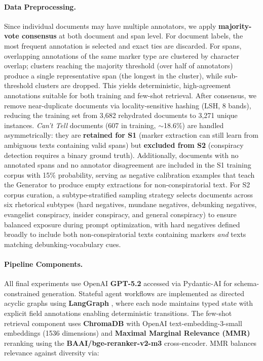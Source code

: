 \documentclass[11pt]{article}
\begin{document}
\paragraph{Data Preprocessing.}
Since individual documents may have multiple annotators, we apply
\textbf{majority-vote consensus} at both document and span level. For document
labels, the most frequent annotation is selected and exact ties are discarded.
For spans, overlapping annotations of the same marker type are clustered by
character overlap; clusters reaching the majority threshold (over half of
annotators) produce a single representative span (the longest in the cluster),
while sub-threshold clusters are dropped. This yields deterministic,
high-agreement annotations suitable for both training and few-shot retrieval.
After consensus, we remove near-duplicate documents via locality-sensitive
hashing (LSH, 8 bands), reducing the training set from 3,682 rehydrated
documents to 3,271 unique instances. \textit{Can't Tell} documents (607 in
training, $\sim$18.6\%) are handled asymmetrically: they are \textbf{retained
	for S1} (marker extraction can still learn from ambiguous texts containing
valid spans) but \textbf{excluded from S2} (conspiracy detection requires a
binary ground truth). Additionally, documents with no annotated spans and no
annotator disagreement are included in the S1 training corpus with 15\%
probability, serving as negative calibration examples that teach the Generator
to produce empty extractions for non-conspiratorial text. For S2 corpus
curation, a subtype-stratified sampling strategy selects documents across six
rhetorical subtypes (hard negatives, mundane negatives, debunking negatives,
evangelist conspiracy, insider conspiracy, and general conspiracy) to ensure
balanced exposure during prompt optimization, with hard negatives defined
broadly to include both non-conspiratorial texts containing markers
\textit{and} texts matching debunking-vocabulary cues.

\paragraph{Pipeline Components.} All final experiments use OpenAI \textbf{GPT-5.2} accessed via Pydantic-AI
\cite{pydanticai2024} for schema-constrained generation. Stateful agent
workflows are implemented as directed acyclic graphs using \textbf{LangGraph}
\cite{langgraph2024}, where each node maintains typed state with explicit field
annotations enabling deterministic transitions. The few-shot retrieval
component uses \textbf{ChromaDB} \cite{chromadb2023} with OpenAI
text-embedding-3-small embeddings (1536 dimensions) and \textbf{Maximal
	Marginal Relevance (MMR)} reranking \cite{carbonell1998mmr} using the
\textbf{BAAI/bge-reranker-v2-m3} cross-encoder. MMR balances relevance against
diversity via:
\end{document}
